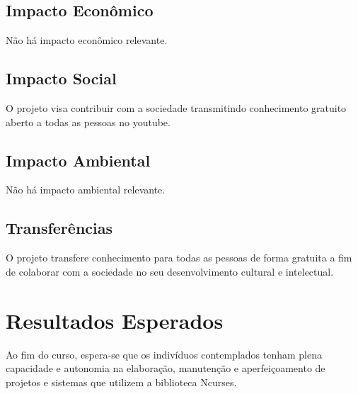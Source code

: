 \documentclass[a4paper,10pt]{article} %
\begin{document}
\subsection{Impacto Econômico}

Não há impacto econômico relevante.

\subsection{Impacto Social}

O projeto visa contribuir com a sociedade transmitindo conhecimento gratuito aberto a todas as pessoas no youtube.

\subsection{Impacto Ambiental}

Não há impacto ambiental relevante.

\subsection{Transferências}

O projeto transfere conhecimento para todas as pessoas de forma gratuita a fim de colaborar com a sociedade no seu desenvolvimento cultural e intelectual.


\section{Resultados Esperados}
Ao fim do curso, espera-se que os indivíduos contemplados tenham plena capacidade e autonomia na elaboração, manutenção e aperfeiçoamento de  projetos e sistemas que utilizem a biblioteca Ncurses.

\end{document}
